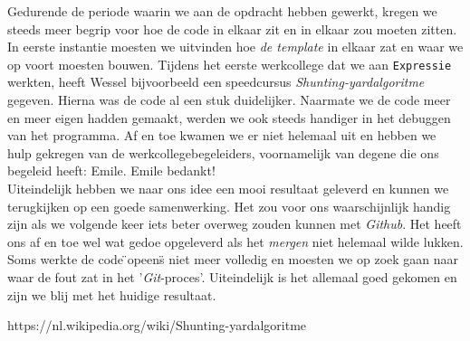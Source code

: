 \documentclass[12pt]{article}
\begin{document}
Gedurende de periode waarin we aan de opdracht hebben gewerkt, kregen we steeds meer begrip voor hoe de code in elkaar zit en in elkaar zou moeten zitten. In eerste instantie moesten we uitvinden hoe \textit{de template} in elkaar zat en waar we op voort moesten bouwen. Tijdens het eerste werkcollege dat we aan \texttt{Expressie} werkten, heeft Wessel bijvoorbeeld een speedcursus \textit{Shunting-yardalgoritme} gegeven. Hierna was de code al een stuk duidelijker. Naarmate we de code meer en meer eigen hadden gemaakt, werden we ook steeds handiger in het debuggen van het programma. Af en toe kwamen we er niet helemaal uit en hebben we hulp gekregen van de werkcollegebegeleiders, voornamelijk van degene die ons begeleid heeft: Emile. Emile bedankt!\\ \newline
Uiteindelijk hebben we naar ons idee een mooi resultaat geleverd en kunnen we terugkijken op een goede samenwerking. Het zou voor ons waarschijnlijk handig zijn als we volgende keer iets beter overweg zouden kunnen met \textit{Github}. Het heeft ons af en toe wel wat gedoe opgeleverd als het \textit{mergen} niet helemaal wilde lukken. Soms werkte de code \"{}opeens\"{} niet meer volledig en moesten we op zoek gaan naar waar de fout zat in het '\textit{Git}-proces'. Uiteindelijk is het allemaal goed gekomen en zijn we blij met het huidige resultaat.



\begin{thebibliography}{9}
https://nl.wikipedia.org/wiki/Shunting-yardalgoritme
\end{thebibliography}
\end{document}
